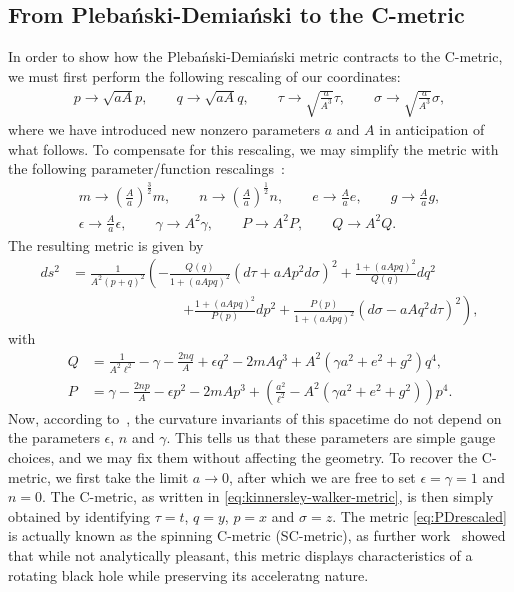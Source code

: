 \documentclass[
twoside,
openright,
frontopenright,
]{dmathesis}
\newcommand{\nn}{\nonumber}
\newcommand{\PD}{Pleba\'nski-Demia\'nski}
\begin{document}
\subsection{From \PD{} to the C-metric}
\label{sec:PDtoC}

In order to show how the \PD{} metric contracts to the C-metric, we must first
perform the following rescaling of our coordinates:
\begin{align}
  p\to\sqrt{aA}p, \qquad q\to\sqrt{aA} q, \qquad
  \tau\to\sqrt{\frac{a}{A^3}}\tau, \qquad \sigma\to\sqrt{\frac{a}{A^3}}\sigma,
\end{align}
where we have introduced new nonzero parameters $a$ and $A$ in anticipation of
what follows. To compensate for this rescaling, we may simplify the metric with
the following parameter/function rescalings~\cite{Plebanski:1976gy,Pravda:2002kj}:
\begin{gather}
  m\to \left(\frac{A}{a}\right)^\frac32 m, \qquad n\to
  \left(\frac{A}{a}\right)^\frac12 n, \qquad e\to\frac{A}{a}e, \qquad
  g\to\frac{A}{a}g,\nn\\
  \epsilon\to \frac{A}{a}\epsilon, \qquad \gamma\to A^2\gamma, \qquad P\to A^2P,
  \qquad Q\to A^2 Q.
\end{gather}
The resulting metric is given by
\begin{align}
  \label{eq:PDrescaled}
  ds^2 &= \frac{1}{A^2(p + q)^2} \left( - \frac{Q(q)}{1+(aApq)^2}(d\tau + aAp^2
         d\sigma)^2 + \frac{1+(aApq)^2}{Q(q)}dq^2 \right.\nn\\
  &\hspace{8em}\left. + \frac{1+(aApq)^2}{P(p)}dp^2 +
         \frac{P(p)}{1+(aApq)^2}(d\sigma - aAq^2 d\tau)^2 \right),
\end{align}
with
\begin{align}
  \label{eq:PDfnrescaled}
  Q &= \frac{1}{A^2\ell^2} - \gamma - \frac{2nq}{A} + \epsilon q^2 -
      2mAq^3 + A^2\left(\gamma a^2 + e^2 + g^2\right)q^4,\nn\\
  P &=  \gamma - \frac{2np}{A} - \epsilon p^2 -
      2mAp^3 + \left(\frac{a^2}{\ell^2} - A^2(\gamma a^2+e^2+g^2)\right)p^4.
\end{align}
Now, according to~\cite{Plebanski:1976gy}, the curvature invariants of this
spacetime do not depend on the parameters $\epsilon$, $n$ and $\gamma$. This
tells us that these parameters are simple gauge choices, and we may fix them
without affecting the geometry. To recover the C-metric, we first take the limit
$a\to 0$, after which we are free to set $\epsilon=\gamma=1$ and $n=0$. The
C-metric, as written in \cref{eq:kinnersley-walker-metric}, is then simply
obtained by identifying $\tau=t$, $q=y$, $p=x$ and $\sigma=z$. The metric
\eqref{eq:PDrescaled} is actually known as the spinning C-metric (SC-metric),
as further
work~\cite{Farhoosh:1980zz,Bicak:1999sa,Letelier:1998rx,Pravda:2002kj} showed
that while not analytically pleasant, this metric displays characteristics of a
rotating black hole while preserving its acceleratng nature.
\end{document}
